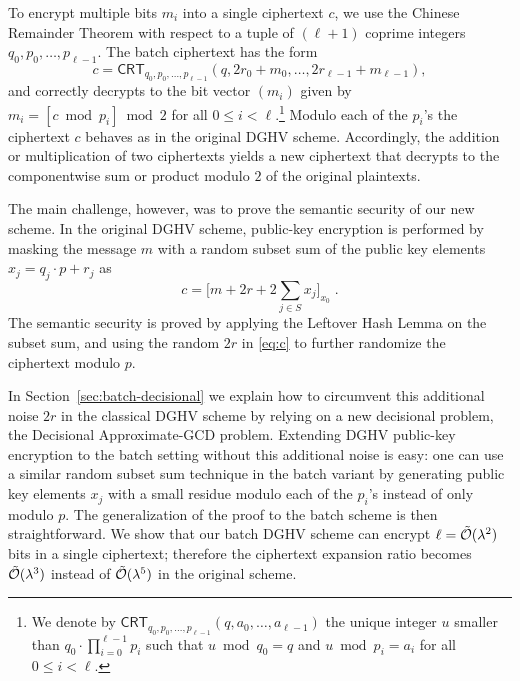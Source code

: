 \documentclass[11pt]{llncs}
\renewcommand\leq\leqslant
\newcommand{\Ot}[1]{{\cal \tilde O}(#1)}
\newcommand*{\crt}{\ensuremath{\mathsf{CRT}}}
\begin{document}
To encrypt multiple bits $m_i$ into a single
ciphertext $c$, we use the Chinese Remainder
Theorem with respect to a tuple of $(\ell+1)$ coprime integers $q_0,p_0,\ldots,p_{\ell-1}$. The batch ciphertext has the form
\[ c = \crt_{q_0,p_0,\ldots,p_{\ell-1}}(q, 2r_0+m_0,\ldots,2r_{\ell-1}+m_{\ell-1}), \]
and correctly decrypts to the bit vector $(m_i)$ given by $m_i=[c \bmod p_i]\bmod 2$ for all $0 \leq i < \ell$.\footnote{We denote by 
$\crt_{q_0,p_0,\ldots,p_{\ell-1}}(q,a_0,\ldots,a_{\ell-1})$ the unique
  integer $u$ smaller than $q_0\cdot\prod_{i=0}^{\ell-1} p_i$ such that $u\bmod q_0=q$ and $u\bmod p_i=a_i$ for
  all $0 \leq i < \ell$.} Modulo each of the $p_i$'s the
ciphertext $c$ behaves as in the original DGHV scheme. Accordingly, the
addition or multiplication of two ciphertexts yields a new ciphertext
that decrypts to the componentwise sum or product modulo $2$ of the original
plaintexts.

The main challenge, however, was to prove the semantic security of our new scheme. In the original DGHV scheme, public-key encryption is
performed by masking the message $m$ with a random subset sum of the
public key elements $x_j=q_j \cdot p + r_j$ as
\begin{equation}
\label{eq:c}
c = \bigg[ m+2r+2 \sum\limits_{j \in S} x_j \bigg]_{x_0}\;.
\end{equation}
The semantic security is proved by applying the Leftover Hash Lemma on
the subset sum, and using the random $2r$ in \eqref{eq:c} to further
randomize the ciphertext modulo $p$.

In Section~\ref{sec:batch-decisional} we explain how to circumvent this
additional noise $2r$ in the classical DGHV scheme by relying on a new
decisional problem, the Decisional Approximate-GCD problem. Extending DGHV public-key
encryption to the batch setting without this additional noise is easy: one can use
a similar random subset sum technique in the batch variant by generating
public key elements $x_j$ with a small residue modulo each of the $p_i$'s
instead of only modulo $p$. The generalization of the proof to the batch
scheme is then straightforward. We show that our batch DGHV scheme
can encrypt $\ell=\Ot{\lambda^2}$ bits in a single ciphertext; therefore
the ciphertext expansion ratio becomes $\Ot{\lambda^3}$ instead of
$\Ot{\lambda^5}$ in the original scheme.
\end{document}
